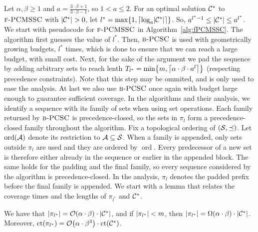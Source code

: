 Let $\alpha,\beta\geq 1$ and $a=\frac{3\cdot\beta+1}{3\cdot\beta-1}$, so $1<a\leq 2$.
For an optimal solution $\mathcal{C}^{*}$ to $\textup{\textsc{f-PCMSSC}}$ with $\spr{\cCopt}>0$, let $l^*=\max\mathopen{}\left\{ 1,\mathopen{}\left\lceil \log_a\mathopen{}\left| \mathcal{C}^{*} \right| \right\rceil \right\}$.
So, $a^{l^*-1}\leq\mathopen{}\left| \mathcal{C}^{*} \right|\leq a^{l^*}$.
We start with pseudocode for $\textup{\textsc{f-PCMSSC}}$ in Algorithm~\ref{alg:fPCMSSC}. The algorithm first guesses the value of $l^*$. Then, $\textup{\textsc{b-PCSC}}$ is used with geometrically growing budgets, $l^*$ times, which is done to ensure that we can reach a large budget, with small cost. Next, for the sake of the argument we pad the sequence by adding arbitrary sets to reach lenth $T_{l^*}=\min\mathopen{}\left\{ m,\mathopen{}\left\lceil \alpha\cdot\beta\cdot a^l \right\rceil \right\}$ (respecting precedence constraints). Note that this step may be ommited, and is only used to ease the analysis. At last we also use $\textup{\textsc{b-PCSC}}$ once again with budget large enough to guarantee sufficient coverage.
In the algorithms and their analysis, we identify a sequence with its family of sets when using set operations. Each family returned by $\textup{\textsc{b-PCSC}}$ is precedence-closed, so the sets in $\pi_l$ form a precedence-closed family throughout the algorithm.
Fix a topological ordering of $(\mathcal{S},\preceq)$. Let $\operatorname{ord}(\mathcal{A})$ denote its restriction to $\mathcal{A}\subseteq\mathcal{S}$. When a family is appended, only sets outside $\pi_l$ are used and they are ordered by $\operatorname{ord}$. Every predecessor of a new set is therefore either already in the sequence or earlier in the appended block. The same holds for the padding and the final family, so every sequence considered by the algorithm is precedence-closed. In the analysis, $\pi_l$ denotes the padded prefix before the final family is appended.
We start with a lemma that relates the coverage times and the lengths of $\pi_{l^*}$ and $\mathcal{C}^{*}$.

    \begin{lemma}\label{lem:pi-spread-cost}
        We have that $\mathopen{}\left| \pi_{l^*} \right| = \mathcal{O}\mathopen{}\left( \alpha \cdot \beta \right)\cdot \mathopen{}\left| \mathcal{C}^{*} \right|$, and if $\mathopen{}\left| \pi_{l^*} \right|<m$, then $\mathopen{}\left| \pi_{l^*} \right|=\Omega\mathopen{}\left( \alpha\cdot\beta \right)\cdot\mathopen{}\left| \mathcal{C}^{*} \right|$. Moreover, $\operatorname{ct}\mathopen{}\left( \pi_{l^*} \right) = \mathcal{O}\mathopen{}\left( \alpha\cdot\beta^3 \right)\cdot \operatorname{ct}\mathopen{}\left( \mathcal{C}^{*} \right)$.
    \end{lemma}
